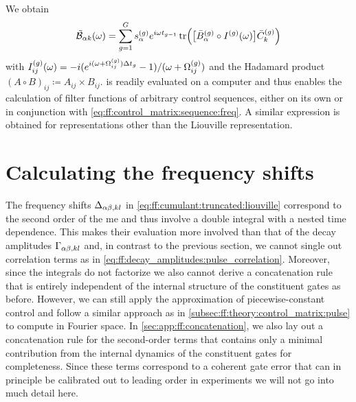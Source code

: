 We obtain
\begin{equation}\label{eq:ff:control_matrix:pulse:freq:ff:calculation}
    \tilde{\mathcal{B}}_{\alpha k}(\omega) = \sum_{g = 1}^G s_\alpha^{(g)}e^{i\omega t_{g-1}}\tr(\bigl[\bar{B}_\alpha^{(g)}\circ I^{(g)}(\omega)\bigr]\bar{C}_k^{(g)})
\end{equation}
with $I_{ij}^{(g)}(\omega) = -i(e^{i(\omega + \Omega_{ij}^{(g)})\Delta t_g} - 1)/(\omega + \Omega_{ij}^{(g)})$ and the Hadamard product $(A\circ B)_{ij}\coloneqq A_{ij}\times B_{ij}$.
 is readily evaluated on a computer and thus enables the calculation of filter functions of arbitrary control sequences, either on its own or in conjunction with \cref{eq:ff:control_matrix:sequence:freq}.
A similar expression is obtained for representations other than the Liouville representation.

\section{Calculating the frequency shifts}\label{sec:ff:theory:frequency_shifts}
The frequency shifts $\Delta_{\alpha\beta,kl}$ in \cref{eq:ff:cumulant:truncated:liouville} correspond to the second order of the \gls{me} and thus involve a double integral with a nested time dependence.
This makes their evaluation more involved than that of the decay amplitudes $\Gamma_{\alpha\beta,kl}$ and, in contrast to the previous section, we cannot single out correlation terms as in \cref{eq:ff:decay_amplitudes:pulse_correlation}.
Moreover, since the integrals do not factorize we also cannot derive a concatenation rule that is entirely independent of the internal structure of the constituent gates as before.
However, we can still apply the approximation of piecewise-constant control and follow a similar approach as in \cref{subsec:ff:theory:control_matrix:pulse} to compute \freqshifts in Fourier space.
In \cref{sec:app:ff:concatenation}, we also lay out a concatenation rule for the second-order terms that contains only a minimal contribution from the internal dynamics of the constituent gates for completeness.
Since these terms correspond to a coherent gate error that can in principle be calibrated out to leading order in experiments we will not go into much detail here.

